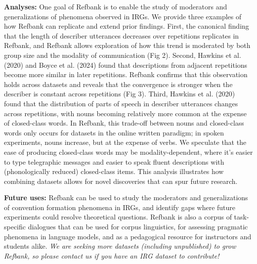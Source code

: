 \documentclass[11pt,a4paper]{article}
\begin{document}
\smallskip
 \textbf{Analyses:} One goal of Refbank is to enable the study of moderators and generalizations of phenomena observed in IRGs. We provide three examples of how Refbank can replicate and extend prior findings. 
First, the canonical finding that the length of describer utterances decreases over repetitions replicates in Refbank, and Refbank allows exploration of how this trend is moderated by both group size and the modality of communication (Fig 2). 
Second, Hawkins et al. (2020) and Boyce et al. (2024)  found that descriptions from adjacent repetitions become more similar in later repetitions. Refbank confirms that this observation holds across datasets and reveals that the convergence is stronger when the describer is constant across repetitions (Fig 3). 
Third, Hawkins et al. (2020) found that the distribution of parts of speech in describer utterances changes across repetitions, with nouns becoming relatively more common at the expense of closed-class words. In Refbank, this trade-off between nouns and closed-class words only occurs for datasets in the online written paradigm; in spoken experiments, nouns increase, but at the expense of verbs. We speculate that the ease of producing closed-class words may be modality-dependent, where it's easier to type telegraphic messages and easier to speak fluent descriptions with (phonologically reduced) closed-class items. This analysis illustrates how combining datasets allows for novel discoveries that can spur future research.

\smallskip
 \textbf{Future uses:} Refbank can be used to study the moderators and generalizations of convention formation phenomena in IRGs, and identify gaps where future experiments could resolve theoretical questions. Refbank is also a corpus of task-specific dialogues that can be used for corpus linguistics, for assessing pragmatic phenomena in language models, and as a pedagogical resource for instructors and students alike.
\textit{We are seeking more datasets (including unpublished) to grow Refbank, so please contact us if you have an IRG dataset to contribute!}



\newpage

\begin{center}\textbf{}\end{center}
\end{document}
